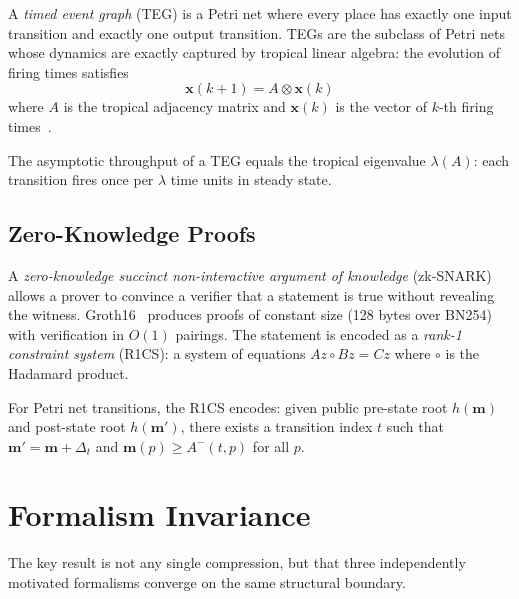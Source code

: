 \documentclass[11pt,a4paper]{article}
\begin{document}
A \emph{timed event graph} (TEG) is a Petri net where every place has exactly one input transition and exactly one output transition.
TEGs are the subclass of Petri nets whose dynamics are exactly captured by tropical linear algebra: the evolution of firing times satisfies
\[
  \mathbf{x}(k+1) = A \otimes \mathbf{x}(k)
\]
where $A$ is the tropical adjacency matrix and $\mathbf{x}(k)$ is the vector of $k$-th firing times~\cite{baccelli1992}.

The asymptotic throughput of a TEG equals the tropical eigenvalue $\lambda(A)$: each transition fires once per $\lambda$ time units in steady state.

\subsection{Zero-Knowledge Proofs}

A \emph{zero-knowledge succinct non-interactive argument of knowledge} (zk-SNARK) allows a prover to convince a verifier that a statement is true without revealing the witness.
Groth16~\cite{groth2016} produces proofs of constant size (128 bytes over BN254) with verification in $O(1)$ pairings.
The statement is encoded as a \emph{rank-1 constraint system} (R1CS): a system of equations $Az \circ Bz = Cz$ where $\circ$ is the Hadamard product.

For Petri net transitions, the R1CS encodes: given public pre-state root $h(\mathbf{m})$ and post-state root $h(\mathbf{m}')$, there exists a transition index $t$ such that $\mathbf{m}' = \mathbf{m} + \Delta_t$ and $\mathbf{m}(p) \geq A^-(t,p)$ for all $p$.

\section{Formalism Invariance}
\label{sec:invariance}

The key result is not any single compression, but that three independently motivated formalisms converge on the same structural boundary.
\end{document}
